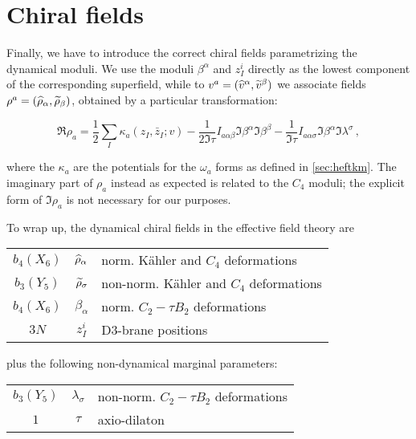\section{Chiral fields}\label{sec:heftchiral}

Finally, we have to introduce the correct chiral fields parametrizing the dynamical moduli. We use the moduli $\beta^\alpha$ and $z_I^i$ directly as the lowest component of the corresponding superfield, while to $v^a = (\widehat{v}^\alpha,\widetilde{v}^\beta)$ we associate fields $\rho^a = (\widehat{\rho}_\alpha, \widetilde{\rho}_\beta)$, obtained by a particular transformation:

\begin{equation}
	\Re{\rho_a} = \frac{1}{2}\sum_I \kappa_a(z_I, \bar z_I ; v) - \frac{1}{2 \Im \tau} I_{a\alpha\beta} \Im \beta^\alpha \Im \beta^\beta - \frac{1}{\Im \tau} I_{a\alpha\sigma} \Im \beta^\alpha \Im \lambda^\sigma\,,
	\label{rhov}
\end{equation}

where the $\kappa_a$ are the potentials for the $\omega_a$ forms as defined in \ref{sec:heftkm}. The imaginary part of $\rho_a$ instead as expected is related to the $C_4$ moduli; the explicit form of $\Im \rho_a$ is not necessary for our purposes.

To wrap up, the dynamical chiral fields in the effective field theory are


\begin{center}
\begin{tabular}{|c | c | l |}
	\hline
	$b_4(X_6)$	& $\widehat{\rho}_\alpha$	& norm. K\"ahler and $C_4$ deformations\\
	$b_3(Y_5)$	& $\widetilde{\rho}_\sigma$	& non-norm. K\"ahler and $C_4$ deformations\\
	$b_4(X_6)$	& $\beta_\alpha$	& norm. $C_2 - \tau B_2$ deformations\\
	$3N$ 		& $z_I^i$		& D3-brane positions\\
	\hline
\end{tabular}
\end{center}

plus the following non-dynamical marginal parameters:\\

\begin{center}
\begin{tabular}{|c | c | l |}
	\hline
	$b_3(Y_5)$ 	& $\lambda_\sigma$	& non-norm. $C_2 - \tau B_2$ deformations\\
	$1$		& $\tau$		& axio-dilaton\\
	\hline
\end{tabular}
\end{center}

